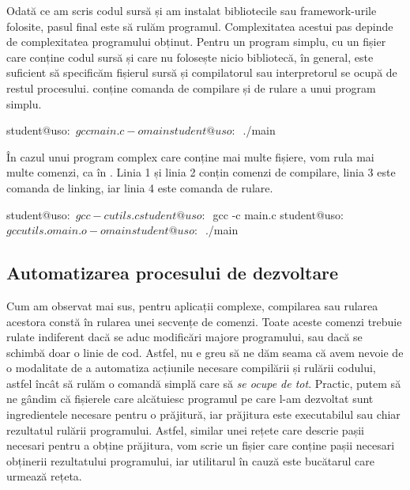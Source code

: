 Odată ce am scris codul sursă și am instalat bibliotecile sau framework-urile folosite, pasul final este să rulăm programul.
Complexitatea acestui pas depinde de complexitatea programului obținut.
Pentru un program simplu, cu un fișier care conține codul sursă și care nu folosește nicio bibliotecă, în general, este suficient să specificăm fișierul sursă și compilatorul sau interpretorul se ocupă de restul procesului.
 conține comanda de compilare și de rulare a unui program simplu.

\begin{screen}[caption={Compilarea și rularea unui program simplu},label={lst:appdev:simple-compile}]
student@uso:~$ gcc main.c -o main
student@uso:~$ ./main
\end{screen}

În cazul unui program complex care conține mai multe fișiere, vom rula mai multe comenzi, ca în .
Linia 1 și linia 2 conțin comenzi de compilare, linia 3 este comanda de linking, iar linia 4 este comanda de rulare.

\begin{screen}[caption={Compilarea și rularea unui program din mai multe surse},label={lst:appdev:multiple-compile}]
student@uso:~$ gcc -c utils.c
student@uso:~$ gcc -c main.c
student@uso:~$ gcc utils.o main.o -o main
student@uso:~$ ./main
\end{screen}

\subsection{Automatizarea procesului de dezvoltare}
\label{sec:appdev:automation}

Cum am observat mai sus, pentru aplicații complexe, compilarea sau rularea acestora constă în rularea unei secvențe de comenzi.
Toate aceste comenzi trebuie rulate indiferent dacă se aduc modificări majore programului, sau dacă se schimbă doar o linie de cod.
Astfel, nu e greu să ne dăm seama că avem nevoie de o modalitate de a automatiza acțiunile necesare compilării și rulării codului, astfel încât să rulăm o comandă simplă care să \textit{se ocupe de tot}.
Practic, putem să ne gândim că fișierele care alcătuiesc programul pe care l-am dezvoltat sunt ingredientele necesare pentru o prăjitură, iar prăjitura este executabilul sau chiar rezultatul rulării programului.
Astfel, similar unei rețete care descrie pașii necesari pentru a obține prăjitura, vom scrie un fișier care conține pașii necesari obținerii rezultatului programului, iar utilitarul în cauză este bucătarul care urmează rețeta.


